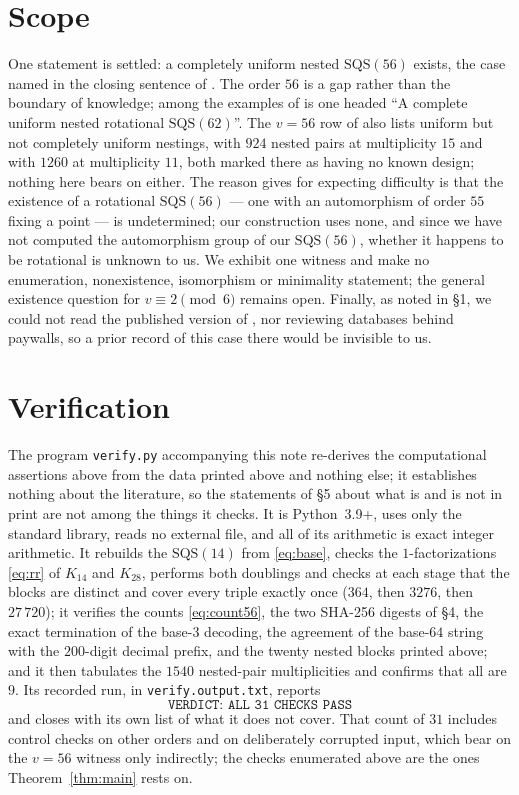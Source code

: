 \documentclass[11pt]{amsart}
\newcommand{\SQS}{\mathrm{SQS}}
\begin{document}
\section{Scope}

One statement is settled: a completely uniform nested $\SQS(56)$ exists, the
case named in the closing sentence of \cite[\S5]{Lu}. The order $56$ is a gap
rather than the boundary of knowledge; among the examples of \cite{CDEKZ} is one
headed ``A complete uniform nested rotational $\SQS(62)$''. The $v=56$ row of
\cite{CDEKZ} also lists uniform but not completely uniform nestings, with $924$
nested pairs at multiplicity $15$ and with $1260$ at multiplicity $11$, both
marked there as having no known design; nothing here bears on either. The reason
\cite{Lu} gives for expecting difficulty is that the existence of a rotational
$\SQS(56)$ --- one with an automorphism of order $55$ fixing a point --- is
undetermined; our construction uses none, and since we have not computed the
automorphism group of our $\SQS(56)$, whether it happens to be rotational is
unknown to us. We exhibit one witness and make no enumeration, nonexistence,
isomorphism or minimality statement; the general existence question for
$v\equiv2\pmod 6$ remains open. Finally, as noted in \S1, we could not read the
published version of \cite{Lu}, nor reviewing databases behind paywalls, so a
prior record of this case there would be invisible to us.

\section{Verification}

The program \texttt{verify.py} accompanying this note re-derives the
computational assertions above from the data printed above and nothing else; it
establishes nothing about the literature, so the statements of \S5 about what is
and is not in print are not among the things it checks. It is Python~3.9+, uses
only the standard library, reads no external file, and all of its arithmetic is
exact integer arithmetic. It rebuilds the $\SQS(14)$ from \eqref{eq:base},
checks the $1$-factorizations
\eqref{eq:rr} of $K_{14}$ and $K_{28}$, performs both doublings and checks at
each stage that the blocks are distinct and cover every triple exactly once
($364$, then $3276$, then $27\,720$); it verifies the counts
\eqref{eq:count56}, the two SHA-256 digests of \S4, the exact termination of the
base-$3$ decoding, the agreement of the base-$64$ string with the $200$-digit
decimal prefix, and the twenty nested blocks printed above; and it then
tabulates the $1540$ nested-pair multiplicities and confirms that all are $9$.
Its recorded run, in \texttt{verify.output.txt}, reports
\[
 \texttt{VERDICT: ALL 31 CHECKS PASS}
\]
and closes with its own list of what it does not cover. That count of $31$
includes control checks on other orders and on deliberately corrupted input,
which bear on the $v=56$ witness only indirectly; the checks enumerated above
are the ones Theorem~\ref{thm:main} rests on.
\end{document}
